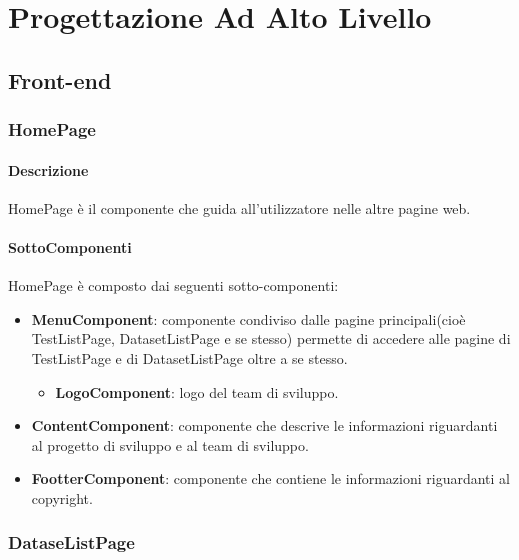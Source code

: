 \section{Progettazione Ad Alto Livello}
\label{sec:ProgettazioneAdAltoLivello}

\subsection{Front-end}
\label{sec:Front-end}
\subsubsection{HomePage}
\paragraph{Descrizione}
HomePage è il componente che guida all'utilizzatore nelle altre pagine web.
\paragraph{SottoComponenti}
HomePage è composto dai seguenti sotto-componenti:
\begin{itemize}
    \item \textbf{MenuComponent}: componente condiviso dalle pagine principali(cioè TestListPage, DatasetListPage e se stesso) permette di accedere alle pagine di TestListPage e di DatasetListPage oltre a se stesso.
    \begin{itemize}
        \item \textbf{LogoComponent}: logo del team di sviluppo.
    \end{itemize}
    
    \item \textbf{ContentComponent}: componente che descrive le informazioni riguardanti al progetto di sviluppo e al team di sviluppo.
    \item \textbf{FootterComponent}: componente che contiene le informazioni riguardanti al copyright.
\end{itemize}

\subsubsection{DataseListPage}
\label{sec:DataseListPage}
